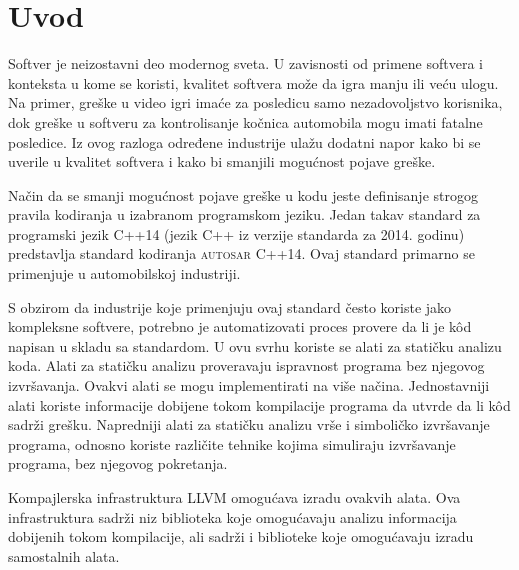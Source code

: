 \documentclass[12pt,oneside]{memoir}
\begin{document}
\frontmatter
\naslovna
\komisija
\apstrakt
\tableofcontents*

\mainmatter

\chapter{Uvod}

Softver je neizostavni deo modernog sveta. U zavisnosti od primene softvera i konteksta u kome se koristi, kvalitet softvera mo\v{z}e da igra
manju ili ve\'{c}u ulogu. Na primer, gre\v{s}ke u video igri ima\'{c}e za posledicu samo nezadovoljstvo korisnika, dok gre\v{s}ke u softveru
za kontrolisanje ko\v{c}nica automobila mogu imati fatalne posledice. Iz ovog razloga određene industrije ula\v{z}u dodatni napor kako bi se uverile u kvalitet softvera
i kako bi smanjili mogu\'{c}nost pojave gre\v{s}ke. \par
Na\v{c}in da se smanji mogu\'{c}nost pojave gre\v{s}ke u kodu jeste definisanje strogog pravila kodiranja u
izabranom programskom jeziku. Jedan takav standard za programski jezik C++14 (jezik C++ iz verzije standarda za 2014. godinu) predstavlja standard kodiranja \textsc{autosar} C++14. Ovaj standard primarno se primenjuje u automobilskoj industriji. \par
S obzirom da industrije koje primenjuju ovaj standard \v{c}esto koriste jako kompleksne softvere, potrebno je automatizovati proces provere da li je k\^{o}d napisan u skladu sa standardom. U ovu svrhu koriste
se alati za stati\v{c}ku analizu koda. Alati za stati\v{c}ku analizu proveravaju ispravnost programa bez njegovog izvr\v{s}avanja. Ovakvi alati se mogu implementirati na
vi\v{s}e na\v{c}ina. Jednostavniji alati koriste informacije dobijene tokom kompilacije programa da utvrde da li k\^{o}d sadr\v{z}i gre\v{s}ku. Napredniji alati za stati\v{c}ku analizu vr\v{s}e i simboli\v{c}ko izvr\v{s}avanje programa, odnosno koriste razli\v{c}ite tehnike kojima simuliraju izvr\v{s}avanje programa, bez njegovog pokretanja.
\par
Kompajlerska infrastruktura LLVM omogu\'{c}ava izradu ovakvih alata. Ova infrastruktura sadr\v{z}i niz biblioteka koje omogu\'{c}avaju analizu informacija dobijenih tokom kompilacije, ali sadr\v{z}i i biblioteke koje omogu\'{c}avaju izradu samostalnih alata.
\end{document}
